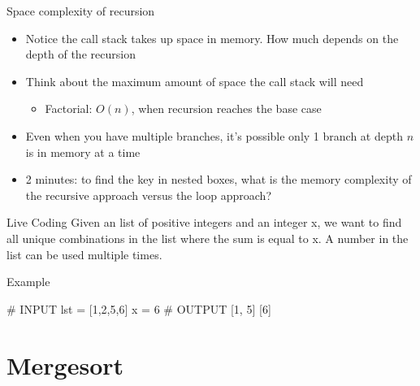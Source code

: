 \documentclass[
  ignorenonframetext,
]{beamer}
\newenvironment{Shaded}{\begin{snugshade}}{\end{snugshade}}
\newcommand{\CommentTok}[1]{\textcolor[rgb]{0.37,0.37,0.37}{#1}}
\newcommand{\DecValTok}[1]{\textcolor[rgb]{0.68,0.00,0.00}{#1}}
\newcommand{\NormalTok}[1]{\textcolor[rgb]{0.00,0.23,0.31}{#1}}
\newcommand{\OperatorTok}[1]{\textcolor[rgb]{0.37,0.37,0.37}{#1}}
\providecommand{\tightlist}{%
  \setlength{\itemsep}{0pt}\setlength{\parskip}{0pt}}\usepackage{longtable,booktabs,array}
\begin{document}
\begin{frame}{Space complexity of recursion}
\protect\hypertarget{space-complexity-of-recursion}{}
\begin{itemize}
\item
  Notice the call stack takes up space in memory. How much depends on
  the depth of the recursion
\item
  Think about the maximum amount of space the call stack will need

  \begin{itemize}
  \tightlist
  \item
    Factorial: \(O(n)\), when recursion reaches the base case
  \end{itemize}
\item
  Even when you have multiple branches, it's possible only 1 branch at
  depth \(n\) is in memory at a time
\item
  2 minutes: to find the key in nested boxes, what is the memory
  complexity of the recursive approach versus the loop approach?
\end{itemize}
\end{frame}

\begin{frame}[fragile]{Live Coding}
\protect\hypertarget{live-coding}{}
Given an list of positive integers and an integer x, we want to find all
unique combinations in the list where the sum is equal to x. A number in
the list can be used multiple times.

\begin{block}{Example}
\protect\hypertarget{example}{}
\begin{Shaded}
\begin{Highlighting}[]
\CommentTok{\# INPUT}
\NormalTok{lst }\OperatorTok{=}\NormalTok{ [}\DecValTok{1}\NormalTok{,}\DecValTok{2}\NormalTok{,}\DecValTok{5}\NormalTok{,}\DecValTok{6}\NormalTok{]}
\NormalTok{x }\OperatorTok{=} \DecValTok{6}
\CommentTok{\# OUTPUT}
\NormalTok{[}\DecValTok{1}\NormalTok{, }\DecValTok{5}\NormalTok{]}
\NormalTok{[}\DecValTok{6}\NormalTok{]}
\end{Highlighting}
\end{Shaded}
\end{block}
\end{frame}

\hypertarget{mergesort}{%
\section{Mergesort}\label{mergesort}}
\end{document}
